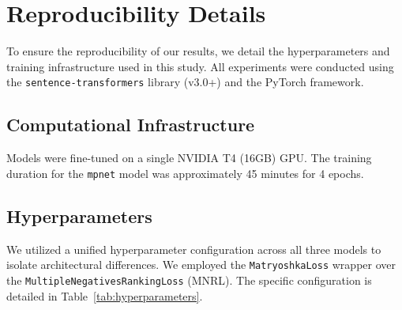 \documentclass[acmsmall,screen,review]{acmart}
\begin{document}








\appendix

\section{Reproducibility Details}

To ensure the reproducibility of our results, we detail the hyperparameters and training infrastructure used in this study. All experiments were conducted using the \texttt{sentence-transformers} library (v3.0+) and the PyTorch framework.

\subsection{Computational Infrastructure}
Models were fine-tuned on a single NVIDIA T4 (16GB) GPU. The training duration for the \texttt{mpnet} model was approximately 45 minutes for 4 epochs.

\subsection{Hyperparameters}
We utilized a unified hyperparameter configuration across all three models to isolate architectural differences. We employed the \texttt{MatryoshkaLoss} wrapper over the \texttt{MultipleNegativesRankingLoss} (MNRL). The specific configuration is detailed in Table~\ref{tab:hyperparameters}.
\end{document}
